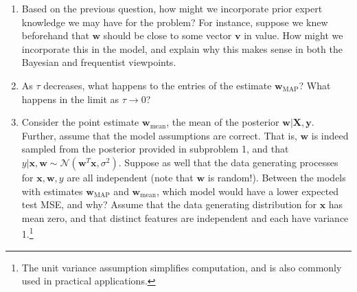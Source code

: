 \documentclass[submit]{harvardml}
\begin{document}
\begin{problem}
\begin{enumerate}
        \item Based on the previous question, how might we incorporate prior expert knowledge we may have for the problem? For instance, suppose we knew beforehand that $\mathbf{w}$ should be close to some vector $\mathbf{v}$ in value. How might we incorporate this in the model, and explain why this makes sense in both the Bayesian and frequentist viewpoints.
        
        \item As $\tau$ decreases, what happens to the entries of the estimate $\mathbf{w}_{\mathrm{MAP}}$? What happens in the limit as $\tau \to 0$?
        
        \item Consider the point estimate $\mathbf{w}_{\mathrm{mean}}$, the mean of the posterior $\mathbf{w}|\mathbf{X},\mathbf{y}$. Further, assume that the model assumptions are correct. That is, $\mathbf{w}$ is indeed sampled from the posterior provided in subproblem 1, and that $y|\mathbf{x},\mathbf{w}\sim\mathcal{N}(\mathbf{w}^T\mathbf{x},\sigma^2)$. Suppose as well that the data generating processes for $\mathbf{x},\mathbf{w},y$ are all independent (note that $\mathbf{w}$ is random!). Between the models with estimates $\mathbf{w}_{\mathrm{MAP}}$ and $\mathbf{w}_{\mathrm{mean}}$, which model would have a lower expected test MSE, and why? Assume that the data generating distribution for $\mathbf{x}$ has mean zero, and that distinct features are independent and each have variance 1.\footnote{The unit variance assumption simplifies computation, and is also commonly used in practical applications.}
        
    \end{enumerate}
  
  
\end{problem}
\end{document}
